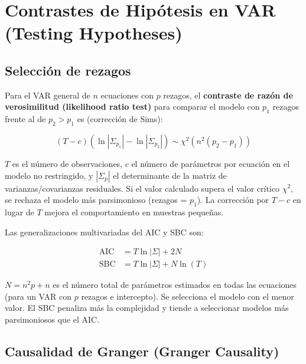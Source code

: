 \documentclass[12pt]{article}
\begin{document}
\section{Contrastes de Hip\'otesis en VAR (Testing Hypotheses)}

\subsection{Selecci\'on de rezagos}

Para el VAR general de $n$ ecuaciones con $p$ rezagos, el \textbf{contraste de raz\'on de verosimilitud (likelihood ratio test)} para comparar el modelo con $p_1$ rezagos frente al de $p_2 > p_1$ es (correcci\'on de Sims):

\begin{equation}
(T - c)\left(\ln|\Sigma_{p_1}| - \ln|\Sigma_{p_2}|\right) \sim \chi^2(n^2(p_2 - p_1))
\end{equation}

\begin{intuicionmat}
$T$ es el n\'umero de observaciones, $c$ el n\'umero de par\'ametros por ecuaci\'on en el modelo no restringido, y $|\Sigma_p|$ el determinante de la matriz de varianzas/covarianzas residuales. Si el valor calculado supera el valor cr\'itico $\chi^2$, se rechaza el modelo m\'as parsimonioso (rezagos = $p_1$). La correcci\'on por $T-c$ en lugar de $T$ mejora el comportamiento en muestras peque\~nas.
\end{intuicionmat}

Las generalizaciones multivariadas del AIC y SBC son:

\begin{align}
\text{AIC} &= T\ln|\Sigma| + 2N \\
\text{SBC} &= T\ln|\Sigma| + N\ln(T)
\end{align}

\begin{intuicionmat}
$N = n^2 p + n$ es el n\'umero total de par\'ametros estimados en todas las ecuaciones (para un VAR con $p$ rezagos e intercepto). Se selecciona el modelo con el menor valor. El SBC penaliza m\'as la complejidad y tiende a seleccionar modelos m\'as parsimoniosos que el AIC.
\end{intuicionmat}

\subsection{Causalidad de Granger (Granger Causality)}
\end{document}
